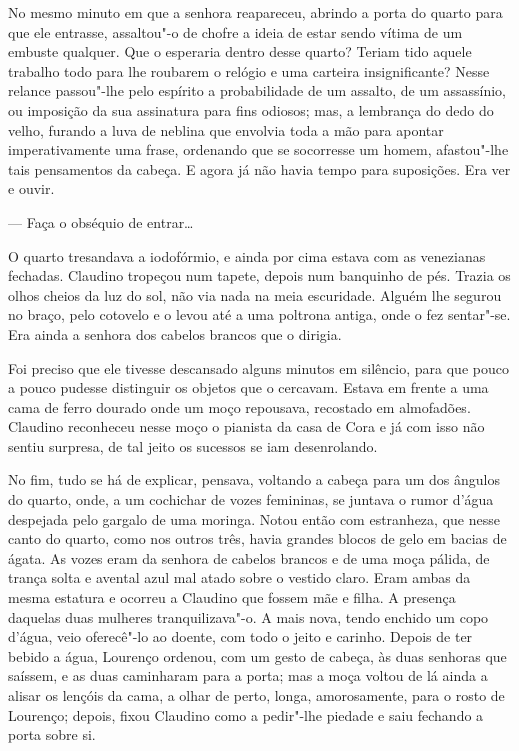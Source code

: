No mesmo minuto em que a senhora reapareceu, abrindo a porta do quarto
para que ele entrasse, assaltou"-o de chofre a ideia de estar sendo
vítima de um embuste qualquer. Que o esperaria dentro desse quarto?
Teriam tido aquele trabalho todo para lhe roubarem o relógio e uma
carteira insignificante? Nesse relance passou"-lhe pelo espírito a
probabilidade de um assalto, de um assassínio, ou imposição da sua
assinatura para fins odiosos; mas, a lembrança do dedo do velho, furando
a luva de neblina que envolvia toda a mão para apontar imperativamente
uma frase, ordenando que se socorresse um homem, afastou"-lhe tais
pensamentos da cabeça. E agora já não havia tempo para suposições. Era
ver e ouvir.

--- Faça o obséquio de entrar\ldots{}

O quarto tresandava a iodofórmio, e ainda por cima estava com as
venezianas fechadas. Claudino tropeçou num tapete, depois num banquinho
de pés. Trazia os olhos cheios da luz do sol, não via nada na meia
escuridade. Alguém lhe segurou no braço, pelo cotovelo e o levou até a
uma poltrona antiga, onde o fez sentar"-se. Era ainda a senhora dos
cabelos brancos que o dirigia.

Foi preciso que ele tivesse descansado alguns minutos em silêncio, para
que pouco a pouco pudesse distinguir os objetos que o cercavam. Estava
em frente a uma cama de ferro dourado onde um moço repousava, recostado
em almofadões. Claudino reconheceu
nesse moço o pianista da casa de Cora e já com isso não sentiu surpresa,
de tal jeito os sucessos se iam desenrolando.

No fim, tudo se há de explicar, pensava, voltando a cabeça para um dos
ângulos do quarto, onde, a um cochichar de vozes femininas, se juntava o
rumor d'água despejada pelo gargalo de uma moringa. Notou então com
estranheza, que nesse canto do quarto, como nos outros três, havia
grandes blocos de gelo em bacias de ágata. As vozes eram da senhora de
cabelos brancos e de uma moça pálida, de trança solta e avental azul mal
atado sobre o vestido claro. Eram ambas da mesma estatura e ocorreu a
Claudino que fossem mãe e filha. A presença daquelas duas mulheres
tranquilizava"-o. A mais nova, tendo enchido um copo d'água, veio
oferecê"-lo ao doente, com todo o jeito e carinho. Depois de ter bebido a
água, Lourenço ordenou, com um gesto de cabeça, às duas senhoras que
saíssem, e as duas caminharam para a porta; mas a moça voltou de lá
ainda a alisar os lençóis da cama, a olhar de perto, longa,
amorosamente, para o rosto de Lourenço; depois, fixou Claudino como a
pedir"-lhe piedade e saiu fechando a porta sobre si.

